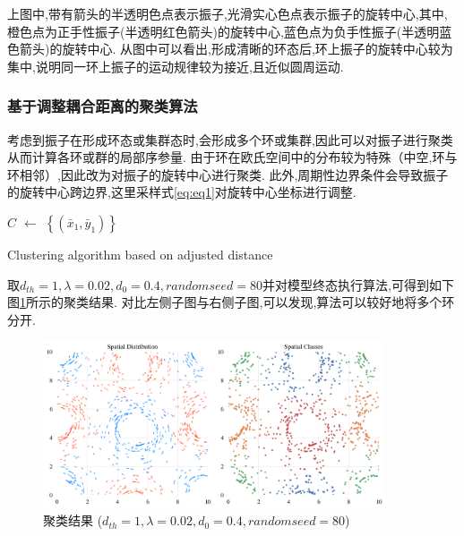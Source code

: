 \documentclass{article}
\begin{document}
上图中,带有箭头的半透明色点表示振子,光滑实心色点表示振子的旋转中心,其中,橙色点为正手性振子(半透明红色箭头)的旋转中心,蓝色点为负手性振子(半透明蓝色箭头)的旋转中心. 从图中可以看出,形成清晰的环态后,环上振子的旋转中心较为集中,说明同一环上振子的运动规律较为接近,且近似圆周运动.



\subsubsection{基于调整耦合距离的聚类算法}\label{clustering}

考虑到振子在形成环态或集群态时,会形成多个环或集群,因此可以对振子进行聚类从而计算各环或群的局部序参量. 由于环在欧氏空间中的分布较为特殊（中空,环与环相邻）,因此改为对振子的旋转中心进行聚类. 此外,周期性边界条件会导致振子的旋转中心跨边界,这里采样式\ref{eq:eq1}对旋转中心坐标进行调整.

\begin{algorithm}

	\BlankLine
	\emph{$C$ $\leftarrow$ $\left\{(\bar{x}_1, \bar{y}_1)\right\}$}\;
	\caption{Clustering algorithm based on adjusted distance}\label{algo_disjdecomp}
\end{algorithm}\DecMargin{1em}

取$d_{th}=1, \lambda=0.02, d_0=0.4, random seed=80$并对模型终态执行算法,可得到如下图\ref{fig:fig233.1}所示的聚类结果. 对比左侧子图与右侧子图,可以发现,算法可以较好地将多个环分开.

\begin{figure}[H]
	\centering
	\includegraphics[width=0.9\textwidth]{./figs/ClusteringResult.png}
	\vspace{-0.4cm}
	\caption{聚类结果 ($d_{th}=1, \lambda=0.02, d_0=0.4, random seed=80$)}
	\label{fig:fig233.1}
\end{figure}
\end{document}
